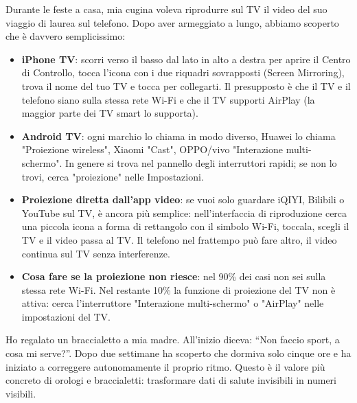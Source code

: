Durante le feste a casa, mia cugina voleva riprodurre sul TV il video del suo viaggio di laurea sul telefono. Dopo aver armeggiato a lungo, abbiamo scoperto che è davvero semplicissimo:

\begin{itemize}
  \item \textbf{iPhone TV}: scorri verso il basso dal lato in alto a destra per aprire il Centro di Controllo, tocca l'icona con i due riquadri sovrapposti (Screen Mirroring), trova il nome del tuo TV e tocca per collegarti. Il presupposto è che il TV e il telefono siano sulla stessa rete Wi-Fi e che il TV supporti AirPlay (la maggior parte dei TV smart lo supporta).
  \item \textbf{Android TV}: ogni marchio lo chiama in modo diverso, Huawei lo chiama "Proiezione wireless", Xiaomi "Cast", OPPO/vivo "Interazione multi-schermo". In genere si trova nel pannello degli interruttori rapidi; se non lo trovi, cerca "proiezione" nelle Impostazioni.
  \item \textbf{Proiezione diretta dall'app video}: se vuoi solo guardare iQIYI, Bilibili o YouTube sul TV, è ancora più semplice: nell'interfaccia di riproduzione cerca una piccola icona a forma di rettangolo con il simbolo Wi-Fi, toccala, scegli il TV e il video passa al TV. Il telefono nel frattempo può fare altro, il video continua sul TV senza interferenze.
  \item \textbf{Cosa fare se la proiezione non riesce}: nel 90\% dei casi non sei sulla stessa rete Wi-Fi. Nel restante 10\% la funzione di proiezione del TV non è attiva: cerca l'interruttore "Interazione multi-schermo" o "AirPlay" nelle impostazioni del TV.
\end{itemize}


Ho regalato un braccialetto a mia madre. All'inizio diceva: “Non faccio sport, a cosa mi serve?”. Dopo due settimane ha scoperto che dormiva solo cinque ore e ha iniziato a correggere autonomamente il proprio ritmo. Questo è il valore più concreto di orologi e braccialetti: trasformare dati di salute invisibili in numeri visibili.

